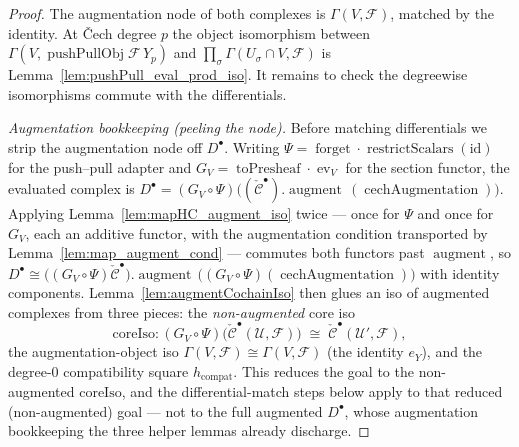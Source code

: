 \begin{proof}
  The augmentation node of both complexes is \(\Gamma(V, \mathcal{F})\), matched by the
  identity. At {\v C}ech degree \(p\) the object isomorphism between
  \(\Gamma(V, \operatorname{pushPullObj}\mathcal{F}\,Y_p)\) and \(\prod_\sigma \Gamma(U_\sigma
  \cap V, \mathcal{F})\) is Lemma~\ref{lem:pushPull_eval_prod_iso}. It remains to check the
  degreewise isomorphisms commute with the differentials.

  \emph{Augmentation bookkeeping (peeling the node).} Before matching differentials we strip the
  augmentation node off \(D^\bullet\). Writing \(\Psi = \operatorname{forget} \cdot
  \operatorname{restrictScalars}(\mathrm{id})\) for the push--pull adapter and \(G_V =
  \operatorname{toPresheaf} \cdot \operatorname{ev}_{V}\) for the section functor, the evaluated
  complex is \(D^\bullet = (G_V \circ \Psi)\bigl((\check{\mathcal{C}}^\bullet)
  .\operatorname{augment}\,(\operatorname{cechAugmentation})\bigr)\). Applying
  Lemma~\ref{lem:mapHC_augment_iso} twice --- once for \(\Psi\) and once for \(G_V\), each an
  additive functor, with the augmentation condition transported by
  Lemma~\ref{lem:map_augment_cond} --- commutes both functors past
  \(\operatorname{augment}\), so \(D^\bullet \cong \bigl((G_V \circ \Psi)
  \check{\mathcal{C}}^\bullet\bigr).\operatorname{augment}\,\bigl((G_V \circ \Psi)
  (\operatorname{cechAugmentation})\bigr)\) with identity components. Lemma~\ref{lem:augmentCochainIso}
  then glues an iso of augmented complexes from three pieces: the \emph{non-augmented} core iso
  \[
    \mathrm{coreIso} : (G_V \circ \Psi)\bigl(\check{\mathcal{C}}^\bullet(\mathcal{U},
      \mathcal{F})\bigr) \;\cong\; \check{\mathcal{C}}^\bullet(\mathcal{U}', \mathcal{F}),
  \]
  the augmentation-object iso \(\Gamma(V, \mathcal{F}) \cong \Gamma(V, \mathcal{F})\) (the
  identity \(e_Y\)), and the degree-\(0\) compatibility square \(h_{\mathrm{compat}}\). This
  reduces the goal to the non-augmented \(\mathrm{coreIso}\), and the differential-match steps
  below apply to that reduced (non-augmented) goal --- not to the full augmented \(D^\bullet\),
  whose augmentation bookkeeping the three helper lemmas already discharge.


\end{proof}
